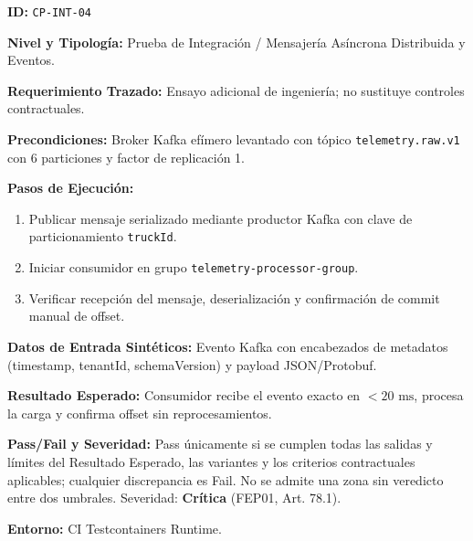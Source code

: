 \par\noindent\textbf{ID:} \texttt{C\allowbreak{}P\allowbreak{}-\allowbreak{}I\allowbreak{}N\allowbreak{}T\allowbreak{}-\allowbreak{}0\allowbreak{}4\allowbreak{}}\par
\par\noindent\textbf{Nivel y Tipología:} Prueba de Integración / Mensajería Asíncrona Distribuida y Eventos.\par
\par\noindent\textbf{Requerimiento Trazado:} Ensayo adicional de ingeniería; no sustituye controles contractuales.\par
\par\noindent\textbf{Precondiciones:} Broker Kafka efímero levantado con tópico \texttt{t\allowbreak{}e\allowbreak{}l\allowbreak{}e\allowbreak{}m\allowbreak{}e\allowbreak{}t\allowbreak{}r\allowbreak{}y\allowbreak{}.\allowbreak{}r\allowbreak{}a\allowbreak{}w\allowbreak{}.\allowbreak{}v\allowbreak{}1\allowbreak{}} con 6 particiones y factor de replicación 1.\par
\par\noindent\textbf{Pasos de Ejecución:} \par
\begin{enumerate}
\item Publicar mensaje serializado mediante productor Kafka con clave de particionamiento \texttt{t\allowbreak{}r\allowbreak{}u\allowbreak{}c\allowbreak{}k\allowbreak{}I\allowbreak{}d\allowbreak{}}.
\item Iniciar consumidor en grupo \texttt{t\allowbreak{}e\allowbreak{}l\allowbreak{}e\allowbreak{}m\allowbreak{}e\allowbreak{}t\allowbreak{}r\allowbreak{}y\allowbreak{}-\allowbreak{}p\allowbreak{}r\allowbreak{}o\allowbreak{}c\allowbreak{}e\allowbreak{}s\allowbreak{}s\allowbreak{}o\allowbreak{}r\allowbreak{}-\allowbreak{}g\allowbreak{}r\allowbreak{}o\allowbreak{}u\allowbreak{}p\allowbreak{}}.
\item Verificar recepción del mensaje, deserialización y confirmación de commit manual de offset.
\end{enumerate}
\par\noindent\textbf{Datos de Entrada Sintéticos:} Evento Kafka con encabezados de metadatos (timestamp, tenantId, schemaVersion) y payload JSON/Protobuf.\par
\par\noindent\textbf{Resultado Esperado:} Consumidor recibe el evento exacto en \(< 20\text{ ms}\), procesa la carga y confirma offset sin reprocesamientos.\par
\par\noindent\textbf{Pass/Fail y Severidad:} Pass únicamente si se cumplen todas las salidas y límites del Resultado Esperado, las variantes y los criterios contractuales aplicables; cualquier discrepancia es Fail. No se admite una zona sin veredicto entre dos umbrales. Severidad: \textbf{Crítica} (FEP01, Art. 78.1).\par
\par\noindent\textbf{Entorno:} CI Testcontainers Runtime.\par







